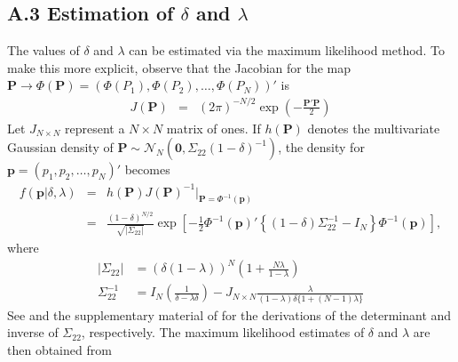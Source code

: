 \documentclass[11pt]{article}
\theoremstyle{definition}
\theoremstyle{definition}
\begin{document}
\subsection*{A.3 Estimation of $\delta$ and $\lambda$}


The values of $\delta$ and $\lambda$ can be estimated via the maximum likelihood method. To make this more explicit, observe that the Jacobian for the map $\boldsymbol{P} \to \Phi\left(\boldsymbol{P}\right) = (\Phi(P_1), \Phi(P_2), \dots, \Phi(P_N))'$ is
\begin{eqnarray*}
J(\boldsymbol{P}) &=& (2\pi)^{-N/2} \exp \left( - \frac{\boldsymbol{P}' \boldsymbol{P}}{2}   \right) 
\end{eqnarray*}
%
Let $J_{N \times N}$ represent a $N\times N$ matrix of ones. If $h(\boldsymbol{P})$ denotes the multivariate Gaussian density of $\boldsymbol{P} \sim \mathcal{N}_N\left(\boldsymbol{0}, \Sigma_{22} (1-\delta)^{-1}\right)$,
the density for  $\boldsymbol{p} = (p_1, p_2, \dots, p_N)'$ becomes
\begin{eqnarray*}
 f\left(\boldsymbol{p} | \delta, \lambda \right) &=& h(\boldsymbol{P}) J(\boldsymbol{P})^{-1} \bigg|_{\boldsymbol{P} = \Phi^{-1}(\boldsymbol{p})}\\
&=& \frac{(1-\delta)^{N/2}}{\sqrt{ \left|\Sigma_{22}\right|}} \exp\left[ -\frac{1}{2} \Phi^{-1}(\boldsymbol{p})' \left\{ (1-\delta) \Sigma_{22}^{-1} - I_N \right\} \Phi^{-1}(\boldsymbol{p})  \right],
\end{eqnarray*}
where
\begin{align}
\left| \Sigma_{22}\right| &= (\delta(1- \lambda))^N \left(1+\frac{N \lambda}{1 - \lambda} \right) \nonumber\\
\Sigma_{22}^{-1} &= I_N \left(\frac{1}{\delta-\lambda\delta} \right) - J_{N \times N} \frac{\lambda}{(1-\lambda)\delta\{1+(N-1) \lambda\}} \label{inverse}
\end{align}
See \citet{rao2009linear} and the supplementary material of \citet{dobbin2005sample} for the derivations of the determinant and inverse of $\Sigma_{22}$, respectively. The maximum likelihood estimates of $\delta$ and $\lambda$ are then obtained from
\end{document}
